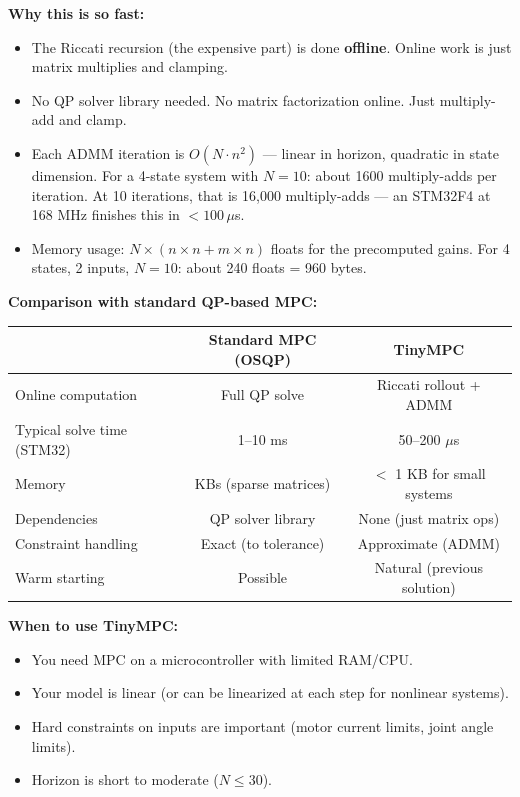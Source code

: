 \textbf{Why this is so fast:}
\begin{itemize}
    \item The Riccati recursion (the expensive part) is done \textbf{offline}. Online work is just matrix multiplies and clamping.
    \item No QP solver library needed. No matrix factorization online. Just multiply-add and clamp.
    \item Each ADMM iteration is $O(N \cdot n^2)$ --- linear in horizon, quadratic in state dimension. For a 4-state system with $N = 10$: about 1600 multiply-adds per iteration. At 10 iterations, that is 16,000 multiply-adds --- an STM32F4 at 168 MHz finishes this in $< 100\,\mu$s.
    \item Memory usage: $N \times (n \times n + m \times n)$ floats for the precomputed gains. For 4 states, 2 inputs, $N = 10$: about 240 floats = 960 bytes.
\end{itemize}

\textbf{Comparison with standard QP-based MPC:}

\begin{center}
\begin{tabular}{lcc}
\toprule
 & \textbf{Standard MPC (OSQP)} & \textbf{TinyMPC} \\
\midrule
Online computation & Full QP solve & Riccati rollout + ADMM \\
Typical solve time (STM32) & 1--10 ms & 50--200 $\mu$s \\
Memory & KBs (sparse matrices) & $<$ 1 KB for small systems \\
Dependencies & QP solver library & None (just matrix ops) \\
Constraint handling & Exact (to tolerance) & Approximate (ADMM) \\
Warm starting & Possible & Natural (previous solution) \\
\bottomrule
\end{tabular}
\end{center}

\textbf{When to use TinyMPC:}
\begin{itemize}
    \item You need MPC on a microcontroller with limited RAM/CPU.
    \item Your model is linear (or can be linearized at each step for nonlinear systems).
    \item Hard constraints on inputs are important (motor current limits, joint angle limits).
    \item Horizon is short to moderate ($N \leq 30$).
\end{itemize}

